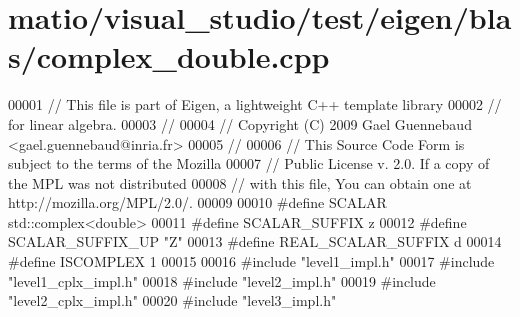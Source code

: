 \hypertarget{matio_2visual__studio_2test_2eigen_2blas_2complex__double_8cpp_source}{}\section{matio/visual\+\_\+studio/test/eigen/blas/complex\+\_\+double.cpp}
\label{matio_2visual__studio_2test_2eigen_2blas_2complex__double_8cpp_source}

\begin{DoxyCode}
00001 \textcolor{comment}{// This file is part of Eigen, a lightweight C++ template library}
00002 \textcolor{comment}{// for linear algebra.}
00003 \textcolor{comment}{//}
00004 \textcolor{comment}{// Copyright (C) 2009 Gael Guennebaud <gael.guennebaud@inria.fr>}
00005 \textcolor{comment}{//}
00006 \textcolor{comment}{// This Source Code Form is subject to the terms of the Mozilla}
00007 \textcolor{comment}{// Public License v. 2.0. If a copy of the MPL was not distributed}
00008 \textcolor{comment}{// with this file, You can obtain one at http://mozilla.org/MPL/2.0/.}
00009 
00010 \textcolor{preprocessor}{#define SCALAR        std::complex<double>}
00011 \textcolor{preprocessor}{#define SCALAR\_SUFFIX z}
00012 \textcolor{preprocessor}{#define SCALAR\_SUFFIX\_UP "Z"}
00013 \textcolor{preprocessor}{#define REAL\_SCALAR\_SUFFIX d}
00014 \textcolor{preprocessor}{#define ISCOMPLEX     1}
00015 
00016 \textcolor{preprocessor}{#include "level1\_impl.h"}
00017 \textcolor{preprocessor}{#include "level1\_cplx\_impl.h"}
00018 \textcolor{preprocessor}{#include "level2\_impl.h"}
00019 \textcolor{preprocessor}{#include "level2\_cplx\_impl.h"}
00020 \textcolor{preprocessor}{#include "level3\_impl.h"}
\end{DoxyCode}
